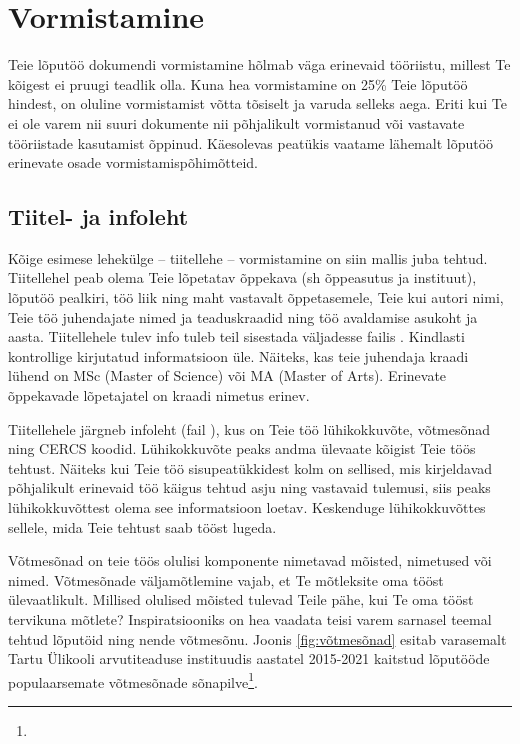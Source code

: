 \section{Vormistamine}  \label{vormistamine}
Teie lõputöö dokumendi vormistamine hõlmab väga erinevaid tööriistu, millest Te kõigest ei pruugi teadlik olla. Kuna hea vormistamine on 25\% Teie lõputöö hindest, on oluline vormistamist võtta tõsiselt ja varuda selleks aega. Eriti kui Te ei ole varem nii suuri dokumente nii põhjalikult vormistanud või vastavate tööriistade kasutamist õppinud. Käesolevas peatükis vaatame lähemalt lõputöö erinevate osade vormistamispõhimõtteid.

\subsection{Tiitel- ja infoleht}
Kõige esimese lehekülge – tiitellehe – vormistamine on siin mallis juba tehtud. Tiitellehel peab olema Teie lõpetatav õppekava (sh õppeasutus ja instituut), lõputöö pealkiri, töö liik ning maht vastavalt õppetasemele, Teie kui autori nimi, Teie töö juhendajate nimed ja teaduskraadid ning töö avaldamise asukoht ja aasta. Tiitellehele tulev info tuleb teil sisestada väljadesse failis . Kindlasti kontrollige kirjutatud informatsioon üle. Näiteks, kas teie juhendaja kraadi lühend on MSc (Master of Science) või MA (Master of Arts). Erinevate õppekavade lõpetajatel on kraadi nimetus erinev.

Tiitellehele järgneb infoleht (fail ), kus on Teie töö lühikokkuvõte, võtmesõnad ning CERCS koodid. Lühikokkuvõte peaks andma ülevaate kõigist Teie töös tehtust. Näiteks kui Teie töö sisupeatükkidest kolm on sellised, mis kirjeldavad põhjalikult erinevaid töö käigus tehtud asju ning vastavaid tulemusi, siis peaks lühikokkuvõttest olema see informatsioon loetav. Keskenduge lühikokkuvõttes sellele, mida Teie tehtust saab tööst lugeda.

Võtmesõnad on teie töös olulisi komponente nimetavad mõisted, nimetused või nimed. Võtmesõnade väljamõtlemine vajab, et Te mõtleksite oma tööst ülevaatlikult. Millised olulised mõisted tulevad Teile pähe, kui Te oma tööst tervikuna mõtlete? Inspiratsiooniks on hea vaadata teisi varem sarnasel teemal tehtud lõputöid ning nende võtmesõnu. Joonis \ref{fig:võtmesõnad} esitab varasemalt Tartu Ülikooli arvutiteaduse instituudis aastatel 2015-2021 kaitstud lõputööde populaarsemate võtmesõnade sõnapilve\footnote{}.

